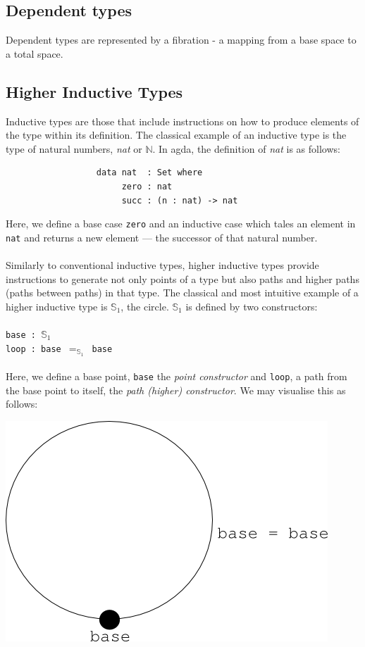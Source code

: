 \documentclass[12pt]{report}
\begin{document}
\subsection{Dependent types}
Dependent types are represented by a fibration - a mapping from a base space to a total space.

\subsection{Higher Inductive Types}
Inductive types are those that include instructions on how to produce elements of the type within its definition. The classical example of an inductive type is the type of natural numbers, \textit{nat} or $\mathbb{N}$. In agda, the definition of \textit{nat} is as follows:\\
\begin{verbatim}
                  data nat  : Set where
                       zero : nat
                       succ : (n : nat) -> nat
\end{verbatim}
Here, we define a base case \texttt{zero} and an inductive case which tales an element in \texttt{nat} and returns a new element --- the successor of that natural number. \\
\\
Similarly to conventional inductive types, higher inductive types provide instructions to generate not only points of a type but also paths and higher paths (paths between paths) in that type. The classical and most intuitive example of a higher inductive type is $\mathbb{S}_1$, the circle. $\mathbb{S}_1$ is defined by two constructors:\\
\\
\-\hspace{4cm}\texttt{base : $\mathbb{S}_1$}\\
\-\hspace{4cm}\texttt{loop : base $=_{\mathbb{S}_1}$ base}
\\
\\
Here, we define a base point, \texttt{base} the \textit{point constructor} and \texttt{loop}, a path from the base point to itself, the \textit{path (higher) constructor}. We may visualise this as follows:
\begin{center}
\includegraphics[scale=0.57]{3.png}
\end{center}
\end{document}
